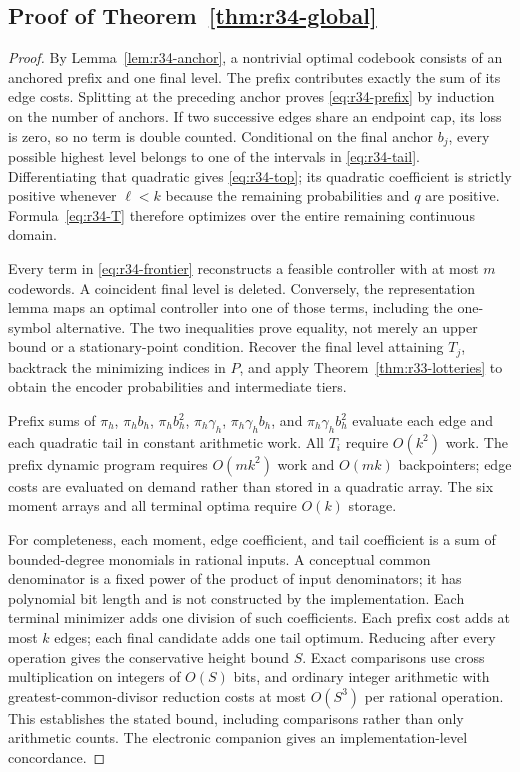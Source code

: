 \subsection{Proof of Theorem~\ref{thm:r34-global}}\label{ec-proof-thm-r34-global}
\begin{proof}
By Lemma~\ref{lem:r34-anchor}, a nontrivial optimal codebook consists of an anchored prefix and one final level. The prefix contributes exactly the sum of its edge costs. Splitting at the preceding anchor proves \eqref{eq:r34-prefix} by induction on the number of anchors. If two successive edges share an endpoint cap, its loss is zero, so no term is double counted. Conditional on the final anchor $b_j$, every possible highest level belongs to one of the intervals in \eqref{eq:r34-tail}. Differentiating that quadratic gives \eqref{eq:r34-top}; its quadratic coefficient is strictly positive whenever $\ell<k$ because the remaining probabilities and $q$ are positive. Formula~\eqref{eq:r34-T} therefore optimizes over the entire remaining continuous domain.

Every term in \eqref{eq:r34-frontier} reconstructs a feasible controller with at most $m$ codewords. A coincident final level is deleted. Conversely, the representation lemma maps an optimal controller into one of those terms, including the one-symbol alternative. The two inequalities prove equality, not merely an upper bound or a stationary-point condition. Recover the final level attaining $T_j$, backtrack the minimizing indices in $P$, and apply Theorem~\ref{thm:r33-lotteries} to obtain the encoder probabilities and intermediate tiers.

Prefix sums of $\pi_h$, $\pi_hb_h$, $\pi_hb_h^2$, $\pi_h\gamma_h$, $\pi_h\gamma_hb_h$, and $\pi_h\gamma_hb_h^2$ evaluate each edge and each quadratic tail in constant arithmetic work. All $T_i$ require $O(k^2)$ work. The prefix dynamic program requires $O(mk^2)$ work and $O(mk)$ backpointers; edge costs are evaluated on demand rather than stored in a quadratic array. The six moment arrays and all terminal optima require $O(k)$ storage.

For completeness, each moment, edge coefficient, and tail coefficient is a sum of bounded-degree monomials in rational inputs. A conceptual common denominator is a fixed power of the product of input denominators; it has polynomial bit length and is not constructed by the implementation. Each terminal minimizer adds one division of such coefficients. Each prefix cost adds at most $k$ edges; each final candidate adds one tail optimum. Reducing after every operation gives the conservative height bound $S$. Exact comparisons use cross multiplication on integers of $O(S)$ bits, and ordinary integer arithmetic with greatest-common-divisor reduction costs at most $O(S^3)$ per rational operation. This establishes the stated bound, including comparisons rather than only arithmetic counts. The electronic companion gives an implementation-level concordance.\end{proof}
